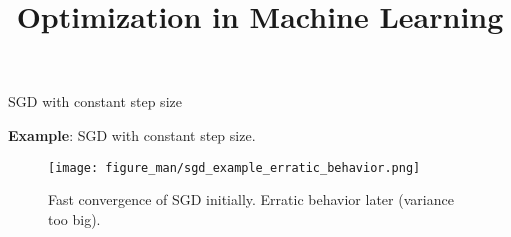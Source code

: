 \documentclass[11pt,compress,t,notes=noshow, xcolor=table]{beamer}
\title{Optimization in Machine Learning}
\begin{document}



\begin{vbframe}{SGD with constant step size}

\textbf{Example}: SGD with constant step size. 

\begin{figure}
    \centering
    \texttt{[image: figure\_man/sgd\_example\_erratic\_behavior.png]}
    \caption*{Fast convergence of SGD initially.
        Erratic behavior later (variance too big).}
\end{figure}

\end{vbframe}
\end{document}
